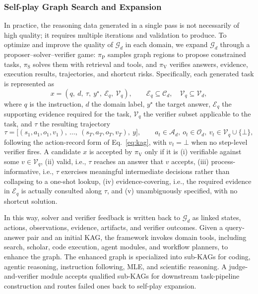 \documentclass{llmxive}
\begin{document}
\subsubsection{Self-play Graph Search and Expansion}
\label{sec:game-generation}

In practice, the reasoning data generated in a single pass is not necessarily of high quality; it requires multiple iterations and validation to produce.
To optimize and improve the quality of $\mathcal{G}_d$ in each domain, we expand $\mathcal{G}_d$ through a proposer--solver--verifier game: $\pi_{\text{P}}$ samples graph regions to propose constrained tasks, $\pi_{\text{S}}$ solves them with retrieval and tools, and $\pi_{\text{V}}$ verifies answers, evidence, execution results, trajectories, and shortcut risks. Specifically, each generated task is represented as
\begin{equation}
x = (q,\ d,\ \tau,\ y^\star,\ \mathcal{E}_q,\ \mathcal{V}_q),
\qquad
\mathcal{E}_q \subseteq \mathcal{C}_d,\quad \mathcal{V}_q \subseteq \mathcal{V}_d,
\label{eq:task}
\end{equation}
where $q$ is the instruction, $d$ the domain label, $y^\star$ the target answer, $\mathcal{E}_q$ the supporting evidence required for the task, $\mathcal{V}_q$ the verifier subset applicable to the task, and $\tau$ the resulting trajectory
\begin{equation}
\tau = \big[(s_1, a_1, o_1, v_1),\ \ldots,\ (s_T, a_T, o_T, v_T),\ y\big],
\qquad
a_t \in \mathcal{A}_d,\ o_t \in \mathcal{O}_d,\ v_t \in \mathcal{V}_q \cup \{\bot\},
\label{eq:trajectory}
\end{equation}
following the action-record form of Eq.~\ref{eq:kag}, with $v_t = \bot$ when no step-level verifier fires.
A candidate $x$ is accepted by $\pi_{\text{V}}$ only if it is (i) verifiable against some $v \in \mathcal{V}_q$, (ii) valid, i.e., $\tau$ reaches an answer that $v$ accepts, (iii) process-informative, i.e., $\tau$ exercises meaningful intermediate decisions rather than collapsing to a one-shot lookup, (iv) evidence-covering, i.e., the required evidence in $\mathcal{E}_q$ is actually consulted along $\tau$, and (v) unambiguously specified, with no shortcut solution.

In this way, solver and verifier feedback is written back to $\mathcal{G}_d$ as linked states, actions, observations, evidence, artifacts, and verifier outcomes. Given a query-answer pair and an initial KAG, the framework invokes domain tools, including search, scholar, code execution, agent modules, and workflow planners, to enhance the graph. The enhanced graph is specialized into sub-KAGs for coding, agentic reasoning, instruction following, MLE, and scientific reasoning. A judge-and-verifier module accepts qualified sub-KAGs for downstream task-pipeline construction and routes failed ones back to self-play expansion.
\end{document}
